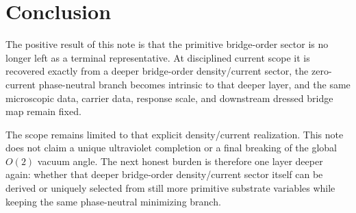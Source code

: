 \documentclass[11pt]{article}
\begin{document}
\section{Conclusion}

The positive result of this note is that the primitive bridge-order sector is no longer left as a terminal representative. At disciplined current scope it is recovered exactly from a deeper bridge-order density/current sector, the zero-current phase-neutral branch becomes intrinsic to that deeper layer, and the same microscopic data, carrier data, response scale, and downstream dressed bridge map remain fixed.

The scope remains limited to that explicit density/current realization. This note does not claim a unique ultraviolet completion or a final breaking of the global \(O(2)\) vacuum angle. The next honest burden is therefore one layer deeper again: whether that deeper bridge-order density/current sector itself can be derived or uniquely selected from still more primitive substrate variables while keeping the same phase-neutral minimizing branch.
\end{document}
